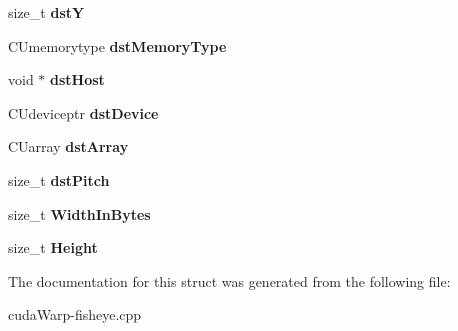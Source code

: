 \begin{DoxyCompactItemize}
\item 
size\+\_\+t {\bfseries dstY}\hypertarget{structCUDA__MEMCPY2D__st_aa360b4a2c8bc1c6b1c7e68d357bbadb0}{}\label{structCUDA__MEMCPY2D__st_aa360b4a2c8bc1c6b1c7e68d357bbadb0}

\item 
C\+Umemorytype {\bfseries dst\+Memory\+Type}\hypertarget{structCUDA__MEMCPY2D__st_ab7e5bea217b43d96affd677a702082e5}{}\label{structCUDA__MEMCPY2D__st_ab7e5bea217b43d96affd677a702082e5}

\item 
void $\ast$ {\bfseries dst\+Host}\hypertarget{structCUDA__MEMCPY2D__st_a916251ae0ad7a508d36bc92e6a18a339}{}\label{structCUDA__MEMCPY2D__st_a916251ae0ad7a508d36bc92e6a18a339}

\item 
C\+Udeviceptr {\bfseries dst\+Device}\hypertarget{structCUDA__MEMCPY2D__st_ac81c6c2ba2cdb23b8d9f0d45ccef3dc7}{}\label{structCUDA__MEMCPY2D__st_ac81c6c2ba2cdb23b8d9f0d45ccef3dc7}

\item 
C\+Uarray {\bfseries dst\+Array}\hypertarget{structCUDA__MEMCPY2D__st_a7a043619ea099f5bf95d317fa6b45f36}{}\label{structCUDA__MEMCPY2D__st_a7a043619ea099f5bf95d317fa6b45f36}

\item 
size\+\_\+t {\bfseries dst\+Pitch}\hypertarget{structCUDA__MEMCPY2D__st_a552ff239ba6b316620fb6d574b0c8d0e}{}\label{structCUDA__MEMCPY2D__st_a552ff239ba6b316620fb6d574b0c8d0e}

\item 
size\+\_\+t {\bfseries Width\+In\+Bytes}\hypertarget{structCUDA__MEMCPY2D__st_a85b86eabce81d83186b39eb376224a49}{}\label{structCUDA__MEMCPY2D__st_a85b86eabce81d83186b39eb376224a49}

\item 
size\+\_\+t {\bfseries Height}\hypertarget{structCUDA__MEMCPY2D__st_a854126b31ec448e4923e5e39456a948f}{}\label{structCUDA__MEMCPY2D__st_a854126b31ec448e4923e5e39456a948f}

\end{DoxyCompactItemize}


The documentation for this struct was generated from the following file\+:\begin{DoxyCompactItemize}
\item 
cuda\+Warp-\/fisheye.\+cpp\end{DoxyCompactItemize}
